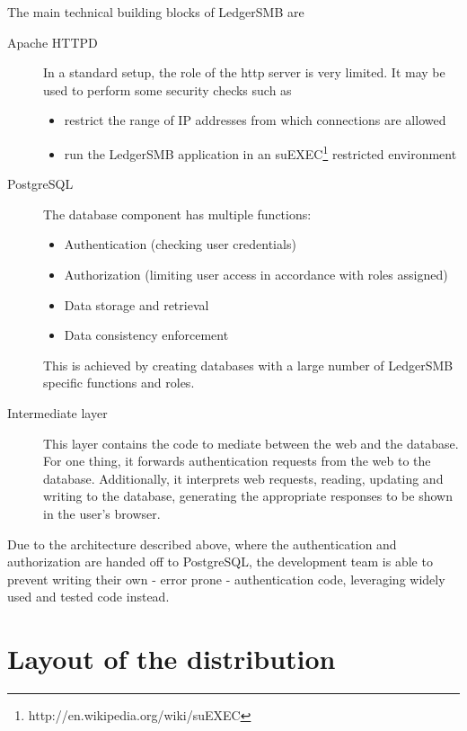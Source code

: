 

The main technical building blocks of LedgerSMB are

\begin{description}
\item[Apache HTTPD] In a standard setup, the role of the http server is very limited. It
may be used to perform some security checks such as
\begin{itemize}
\item restrict the range of IP addresses from which connections are allowed
\item run the LedgerSMB application in an
suEXEC\footnote{http://en.wikipedia.org/wiki/suEXEC} restricted environment
\end{itemize}
\item[PostgreSQL] The database component has multiple functions:
\begin{itemize}
\item Authentication (checking user credentials)
\item Authorization (limiting user access in accordance with roles assigned)
\item Data storage and retrieval
\item Data consistency enforcement
\end{itemize}
This is achieved by creating databases with a large number of LedgerSMB specific
functions and roles.
\item[Intermediate layer] This layer contains the code to mediate between the web
and the database.  For one thing, it forwards authentication requests from the web
to the database.  Additionally, it interprets web requests, reading, updating and
writing to the database, generating the appropriate responses to be shown in the
user's browser.
\end{description}

Due to the architecture described above, where the authentication and authorization
are handed off to PostgreSQL, the development team is able to prevent writing their
own - error prone - authentication code, leveraging widely used and tested code instead.

\section{Layout of the distribution}


